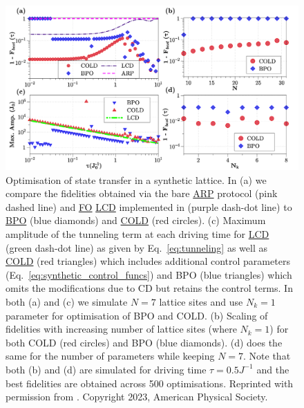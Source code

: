 \documentclass[a4paper,oneside,11pt]{book}
\newcommand{\acrref}[1]{\hyperref[acr:#1]{#1}}
\begin{document}
\begin{figure}[t]
    \centering
    \includegraphics[width=\linewidth]{images/synthetic_lattice.png} \caption[COLD plots for ARP transport in a synthetic lattice]{Optimisation of state transfer in a synthetic lattice.  In (a) we compare the fidelities obtained via the bare \acrref{ARP} protocol (pink dashed line) and \acrref{FO} \acrref{LCD} implemented in \cite{meier_counterdiabatic_2020} (purple dash-dot line) to \acrref{BPO} (blue diamonds) and \acrref{COLD} (red circles). (c) Maximum amplitude of the tunneling term at each driving time for \acrref{LCD} (green dash-dot line) as given by Eq.~\eqref{eq:tunneling} as well as \acrref{COLD} (red triangles) which includes additional control parameters (Eq.~\eqref{eq:synthetic_control_funcs}) and BPO (blue triangles) which omits the modifications due to CD but retains the control terms. In both (a) and (c) we simulate $N = 7$ lattice sites and use $N_k = 1$ parameter for optimisation of BPO and COLD.  (b) Scaling of fidelities with increasing number of lattice sites (where $N_k = 1$) for both COLD (red circles) and BPO (blue diamonds). (d) does the same for the number of parameters while keeping $N=7$.  Note that both (b) and (d) are simulated for driving time $\tau = 0.5 J^{-1}$ and the best fidelities are obtained across 500 optimisations. Reprinted with permission from \cite{cepaite_counterdiabatic_2023}. Copyright 2023, American Physical Society.}\label{fig:Synthetic}
\end{figure}
\end{document}
